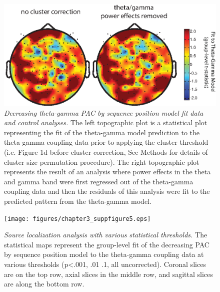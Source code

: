 \begin{figure}
  \centering
  \includegraphics[width=\textwidth]{figures/chapter3_suppfigure4.eps}
  \caption[Decreasing theta-gamma PAC by sequence position model fit data and control analyses]{\textit{Decreasing theta-gamma PAC by sequence position model fit data and control analyses.} The left topographic plot is a statistical plot representing the fit of the theta-gamma model prediction to the theta-gamma coupling data prior to applying the cluster threshold (i.e. Figure 1d before cluster correction, See Methods for details of cluster size permutation procedure).  The right topographic plot represents the result of an analysis where power effects in the theta and gamma band were first regressed out of the theta-gamma coupling data and then the residuals of this analysis were fit to the predicted pattern from the theta-gamma model.}
  \label{chapter3_suppfigure4}
\end{figure}

\begin{figure}
  \centering
  \texttt{[image: figures/chapter3\_suppfigure5.eps]}
  \caption[Source localization analysis with various statistical thresholds]{\textit{Source localization analysis with various statistical thresholds.} The statistical maps represent the group-level fit of the decreasing PAC by sequence position model to the theta-gamma coupling data at various thresholds (p<.001, .01 .1, all uncorrected).  Coronal slices are on the top row, axial slices in the middle row, and sagittal slices are along the bottom row.}
  \label{chapter3_suppfigure5}
\end{figure}

